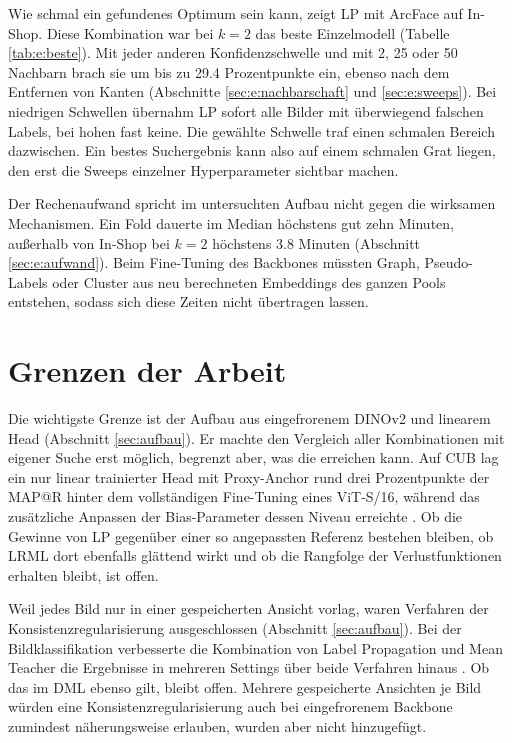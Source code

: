 Wie schmal ein gefundenes Optimum sein kann, zeigt \ac{LP} mit ArcFace auf In-Shop. Diese Kombination war bei $k=2$ das beste Einzelmodell (Tabelle \ref{tab:e:beste}). Mit jeder anderen Konfidenzschwelle und mit 2, 25 oder 50 Nachbarn brach sie um bis zu \num{29.4} Prozentpunkte ein, ebenso nach dem Entfernen von Kanten (Abschnitte \ref{sec:e:nachbarschaft} und \ref{sec:e:sweeps}). Bei niedrigen Schwellen übernahm \ac{LP} sofort alle Bilder mit überwiegend falschen Labels, bei hohen fast keine. Die gewählte Schwelle traf einen schmalen Bereich dazwischen. Ein bestes Suchergebnis kann also auf einem schmalen Grat liegen, den erst die Sweeps einzelner Hyperparameter sichtbar machen.

Der Rechenaufwand spricht im untersuchten Aufbau nicht gegen die wirksamen Mechanismen. Ein Fold dauerte im Median höchstens gut zehn Minuten, außerhalb von In-Shop bei $k=2$ höchstens \num{3.8} Minuten (Abschnitt \ref{sec:e:aufwand}). Beim Fine-Tuning des Backbones müssten Graph, Pseudo-Labels oder Cluster aus neu berechneten Embeddings des ganzen Pools entstehen, sodass sich diese Zeiten nicht übertragen lassen.

\section{Grenzen der Arbeit}
\label{sec:d:grenzen}

Die wichtigste Grenze ist der Aufbau aus eingefrorenem DINOv2 und linearem Head (Abschnitt \ref{sec:aufbau}). Er machte den Vergleich aller Kombinationen mit eigener Suche erst möglich, begrenzt aber, was die \UEBL erreichen kann. Auf \ac{CUB} lag ein nur linear trainierter Head mit Proxy-Anchor rund drei Prozentpunkte der \ac{MAP@R} hinter dem vollständigen Fine-Tuning eines ViT-S/16, während das zusätzliche Anpassen der Bias-Parameter dessen Niveau erreichte \cite{ren_learning_2024}. Ob die Gewinne von \ac{LP} gegenüber einer so angepassten Referenz bestehen bleiben, ob \ac{LRML} dort ebenfalls glättend wirkt und ob die Rangfolge der Verlustfunktionen erhalten bleibt, ist offen.

Weil jedes Bild nur in einer gespeicherten Ansicht vorlag, waren Verfahren der Konsistenzregularisierung ausgeschlossen (Abschnitt \ref{sec:aufbau}). Bei der Bildklassifikation verbesserte die Kombination von Label Propagation und Mean Teacher die Ergebnisse in mehreren Settings über beide Verfahren hinaus \cite{iscen_label_2019}. Ob das im \ac{DML} ebenso gilt, bleibt offen. Mehrere gespeicherte Ansichten je Bild würden eine Konsistenzregularisierung auch bei eingefrorenem Backbone zumindest näherungsweise erlauben, wurden aber nicht hinzugefügt.

